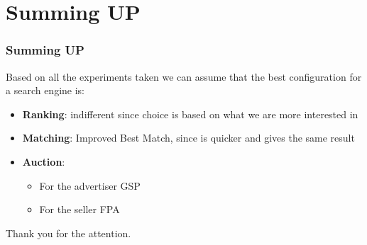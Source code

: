 \documentclass{beamer}
\begin{document}
\section{Summing UP}
\begin{frame}
\frametitle{Summing UP}
Based on all the experiments taken we can assume that the best configuration for a search engine  is:
\begin{itemize}
\item \textbf{Ranking}: indifferent since choice is based on what we are more interested in
\item \textbf{Matching}: Improved Best Match, since is quicker and gives the same result
\item \textbf{Auction}: 
\begin{itemize}
\item For the advertiser GSP
\item For the seller FPA
\end{itemize}
\end{itemize}
\end{frame}

\begin{frame}
\centering 
\Huge{Thank you for the attention.}
\end{frame}
\end{document}
